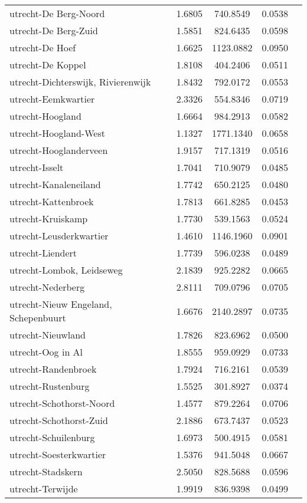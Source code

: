\begin{longtable}{llccc}
utrecht-De Berg-Noord & 1.6805 & 740.8549 & 0.0538 \\
utrecht-De Berg-Zuid & 1.5851 & 824.6435 & 0.0598 \\
utrecht-De Hoef & 1.6625 & 1123.0882 & 0.0950 \\
utrecht-De Koppel & 1.8108 & 404.2406 & 0.0511 \\
utrecht-Dichterswijk, Rivierenwijk & 1.8432 & 792.0172 & 0.0553 \\
utrecht-Eemkwartier & 2.3326 & 554.8346 & 0.0719 \\
utrecht-Hoogland & 1.6664 & 984.2913 & 0.0582 \\
utrecht-Hoogland-West & 1.1327 & 1771.1340 & 0.0658 \\
utrecht-Hooglanderveen & 1.9157 & 717.1319 & 0.0516 \\
utrecht-Isselt & 1.7041 & 710.9079 & 0.0485 \\
utrecht-Kanaleneiland & 1.7742 & 650.2125 & 0.0480 \\
utrecht-Kattenbroek & 1.7813 & 661.8285 & 0.0453 \\
utrecht-Kruiskamp & 1.7730 & 539.1563 & 0.0524 \\
utrecht-Leusderkwartier & 1.4610 & 1146.1960 & 0.0901 \\
utrecht-Liendert & 1.7739 & 596.0238 & 0.0489 \\
utrecht-Lombok, Leidseweg & 2.1839 & 925.2282 & 0.0665 \\
utrecht-Nederberg & 2.8111 & 709.0796 & 0.0705 \\
utrecht-Nieuw Engeland, Schepenbuurt & 1.6676 & 2140.2897 & 0.0735 \\
utrecht-Nieuwland & 1.7826 & 823.6962 & 0.0500 \\
utrecht-Oog in Al & 1.8555 & 959.0929 & 0.0733 \\
utrecht-Randenbroek & 1.7924 & 716.2161 & 0.0539 \\
utrecht-Rustenburg & 1.5525 & 301.8927 & 0.0374 \\
utrecht-Schothorst-Noord & 1.4577 & 879.2264 & 0.0706 \\
utrecht-Schothorst-Zuid & 2.1886 & 673.7437 & 0.0523 \\
utrecht-Schuilenburg & 1.6973 & 500.4915 & 0.0581 \\
utrecht-Soesterkwartier & 1.5376 & 941.5048 & 0.0667 \\
utrecht-Stadskern & 2.5050 & 828.5688 & 0.0596 \\
utrecht-Terwijde & 1.9919 & 836.9398 & 0.0499 \\

\end{longtable}
